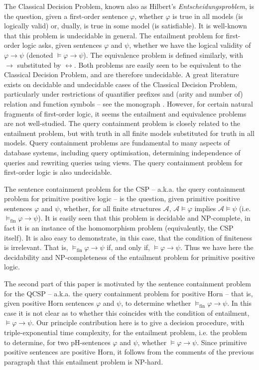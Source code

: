 \documentclass{LMCS}
\begin{document}
The Classical Decision Problem, known also as Hilbert's \emph{Entscheidungsproblem}, is the question, given a first-order sentence $\varphi$, whether $\varphi$ is true in all models (is logically valid) or, dually, is true in some model (is satisfiable). It is well-known that this problem is undecidable in general. The entailment problem for first-order logic asks, given sentences $\varphi$ and $\psi$, whether we have the logical validity of $\varphi \rightarrow \psi$ (denoted $\models \varphi \rightarrow \psi$). The equivalence problem is defined similarly, with $\rightarrow$ substituted by $\leftrightarrow$. Both problems are easily seen to be equivalent to the Classical Decision Problem, and are therefore undecidable. A great literature exists on decidable and undecidable cases of the Classical Decision Problem, particularly under restrictions of quantifier prefixes and (arity and number of) relation and function symbols -- see the monograph \cite{CDP}. However, for certain natural fragments of first-order logic, it seems the entailment and equivalence problems are not well-studied. The query containment problem is closely related to the entailment problem, but with truth in all finite models substituted for truth in all models. Query containment problems are fundamental to many aspects of database systems, including query optimisation, determining independence of queries and rewriting queries using views. The query containment problem for first-order logic is also undecidable.

The sentence containment problem for the CSP -- \mbox{a.k.a.} the query containment problem for primitive positive logic -- is the question, given primitive positive sentences $\varphi$ and $\psi$, whether, for all finite structures $\mathcal{A}$, $\mathcal{A} \models \varphi$ implies $\mathcal{A} \models \psi$ (\mbox{i.e.} $\models_\mathrm{fin} \varphi \rightarrow \psi$). It is easily seen that this problem is decidable and NP-complete, in fact it is an instance of the homomorphism problem (equivalently, the CSP itself). It is also easy to demonstrate, in this case, that the condition of finiteness is irrelevant. That is, $\models_\mathrm{fin} \varphi \rightarrow \psi$ if, and only if, $\models \varphi \rightarrow \psi$. Thus we have here the decidability and NP-completeness of the entailment problem for primitive positive logic.

The second part of this paper is motivated by the sentence containment problem for the QCSP -- \mbox{a.k.a.} the query containment problem for positive Horn -- that is, given positive Horn sentences $\varphi$ and $\psi$, to determine whether $\models_\mathrm{fin} \varphi \rightarrow \psi$. In this case it is not clear as to whether this coincides with the condition of entailment, $\models \varphi \rightarrow \psi$.
Our principle contribution here is to give a decision procedure, with triple-exponential time complexity, for the entailment problem, \mbox{i.e.} the problem to determine, for two pH-sentences $\varphi$ and $\psi$, whether $\models \varphi \rightarrow \psi$. Since primitive positive sentences are positive Horn, it follows from the comments of the previous paragraph that this entailment problem is NP-hard.
\end{document}
